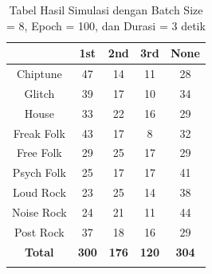 \begin{longtable}[c]{|c|c|c|c|c|}
	\hline
	\textbf{}      & \textbf{1st} & \textbf{2nd} & \textbf{3rd} & \textbf{None} \\ \hline
	\endfirsthead
	\endhead
	Chiptune       & 47           & 14           & 11           & 28            \\ \hline
	Glitch         & 39           & 17           & 10           & 34            \\ \hline
	House          & 33           & 22           & 16           & 29            \\ \hline
	Freak Folk     & 43           & 17           & 8            & 32            \\ \hline
	Free Folk      & 29           & 25           & 17           & 29            \\ \hline
	Psych Folk     & 25           & 17           & 17           & 41            \\ \hline
	Loud Rock      & 23           & 25           & 14           & 38            \\ \hline
	Noise Rock     & 24           & 21           & 11           & 44            \\ \hline
	Post Rock      & 37           & 18           & 16           & 29            \\ \hline
	\textbf{Total} & \textbf{300} & \textbf{176} & \textbf{120} & \textbf{304}  \\ \hline
	\caption{Tabel Hasil Simulasi dengan Batch Size = 8, Epoch = 100, dan Durasi = 3 detik}
	\label{tab:my-table}\\
\end{longtable}

